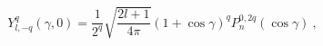 \begin{equation}
\label{Y1}
Y_{l,-q}^q(\gamma,0)=\frac1{2^q}\sqrt{\frac{2l+1}{4\pi}}(1+\cos\gamma)^q
P_n^{0,2q}(\cos\gamma) \ ,
\end{equation}

